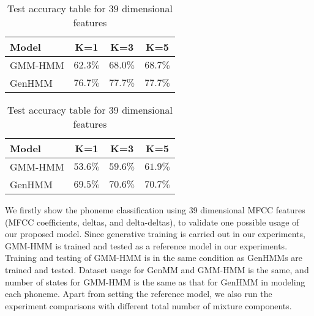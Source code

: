 \documentclass[letterpaper]{article} %
\begin{document}
\begin{table}
  \caption{Test accuracy table for $39$ dimensional features }\label{tab:acc-classification39f}
  \vspace{-0.3cm}
  \centering
  \label{tab:acc-classification39f_a}
  \vspace{-0.1cm}
  \centering  
  \begin{tabular}{l|c|c|c}
    \toprule
    {Model} &  K=1 &  K=3 &  K=5  \\  \midrule
    GMM-HMM & $62.3\%$ &  $68.0\%$ &  $68.7\%$  \\ \midrule
    GenHMM & $76.7\%$ & $77.7\%$ &  $77.7\%$ \\ 
    \bottomrule                                                                  
  \end{tabular}
  \vspace{0.1cm}
  \label{tab:acc-classification39f_b}
  \vspace{-0.1cm}
  \begin{tabular}{l|c|c|c} \toprule
    {Model} &  K=1 &  K=3 &  K=5
    \\ \midrule
    GMM-HMM & $53.6\%$ &  $59.6\%$ & $61.9\%$  \\ \midrule
    GenHMM & $69.5\%$ & $70.6\%$ & $70.7\%$   \\ 
    \bottomrule
  \end{tabular}
  \vspace{0.2cm}
\end{table}
We firstly show the phoneme classification using 39 dimensional MFCC features (MFCC coefficients, deltas, and delta-deltas), to validate one possible usage of our proposed model. Since generative training is carried out in our experiments, GMM-HMM is trained and tested as a reference model in our experiments. Training and testing of GMM-HMM is in the same condition as GenHMMs are trained and tested. Dataset usage for GenMM and GMM-HMM is the same, and number of states for GMM-HMM is the same as that for GenHMM in modeling each phoneme. Apart from setting the reference model, we also run the experiment comparisons with different total number of mixture components.
\end{document}
